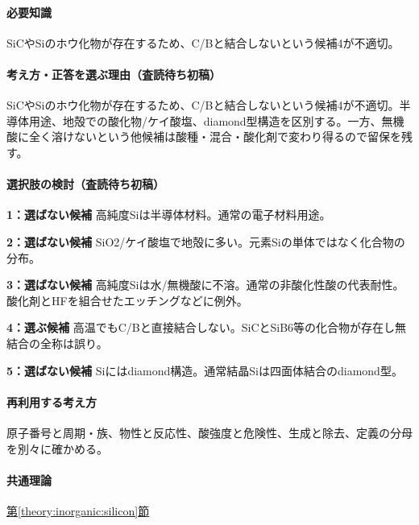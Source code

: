 \paragraph{必要知識} SiCやSiのホウ化物が存在するため、C/Bと結合しないという候補4が不適切。

\paragraph{考え方・正答を選ぶ理由（査読待ち初稿）} SiCやSiのホウ化物が存在するため、C/Bと結合しないという候補4が不適切。半導体用途、地殻での酸化物/ケイ酸塩、diamond型構造を区別する。一方、無機酸に全く溶けないという他候補は酸種・混合・酸化剤で変わり得るので留保を残す。

\paragraph{選択肢の検討（査読待ち初稿）}\mbox{}\par

\noindent\textbf{1：選ばない候補} 高純度Siは半導体材料。通常の電子材料用途。\par

\noindent\textbf{2：選ばない候補} SiO2/ケイ酸塩で地殻に多い。元素Siの単体ではなく化合物の分布。\par

\noindent\textbf{3：選ばない候補} 高純度Siは水/無機酸に不溶。通常の非酸化性酸の代表耐性。酸化剤とHFを組合せたエッチングなどに例外。\par

\noindent\textbf{4：選ぶ候補} 高温でもC/Bと直接結合しない。SiCとSiB6等の化合物が存在し無結合の全称は誤り。\par

\noindent\textbf{5：選ばない候補} Siにはdiamond構造。通常結晶Siは四面体結合のdiamond型。\par

\paragraph{再利用する考え方} 原子番号と周期・族、物性と反応性、酸強度と危険性、生成と除去、定義の分母を別々に確かめる。

\paragraph{共通理論} \hyperref[theory:inorganic:silicon]{第\ref*{theory:inorganic:silicon}節}

